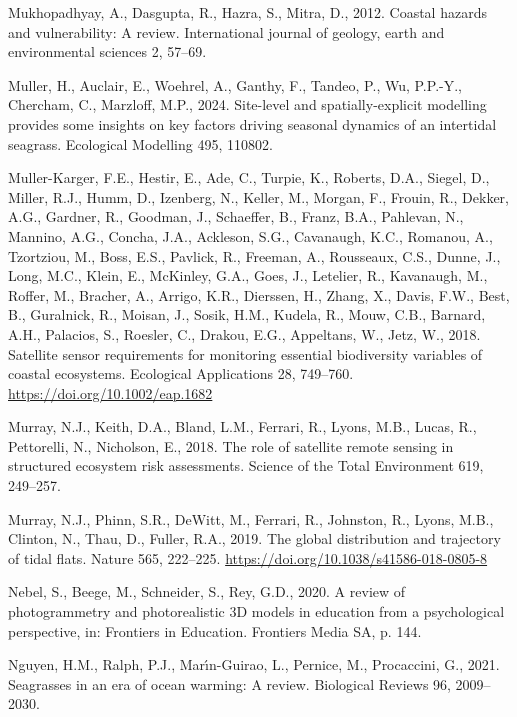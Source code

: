 \documentclass[
  letterpaper,
  11pt,
  english,
  singlespacing,
  headsepline]{MastersDoctoralThesis}
\newlength{\cslhangindent}
\newenvironment{CSLReferences}[2] %
 {\begin{list}{}{%
  \setlength{\itemindent}{0pt}
  \setlength{\leftmargin}{0pt}
  \setlength{\parsep}{0pt}
  \ifodd #1
   \setlength{\leftmargin}{\cslhangindent}
   \setlength{\itemindent}{-1\cslhangindent}
  \fi
  \setlength{\itemsep}{#2\baselineskip}}}
 {\end{list}}
\begin{document}
\begin{CSLReferences}{1}{0}
Mukhopadhyay, A., Dasgupta, R., Hazra, S., Mitra, D., 2012. Coastal
hazards and vulnerability: A review. International journal of geology,
earth and environmental sciences 2, 57--69.

Muller, H., Auclair, E., Woehrel, A., Ganthy, F., Tandeo, P., Wu,
P.P.-Y., Chercham, C., Marzloff, M.P., 2024. Site-level and
spatially-explicit modelling provides some insights on key factors
driving seasonal dynamics of an intertidal seagrass. Ecological
Modelling 495, 110802.

Muller-Karger, F.E., Hestir, E., Ade, C., Turpie, K., Roberts, D.A.,
Siegel, D., Miller, R.J., Humm, D., Izenberg, N., Keller, M., Morgan,
F., Frouin, R., Dekker, A.G., Gardner, R., Goodman, J., Schaeffer, B.,
Franz, B.A., Pahlevan, N., Mannino, A.G., Concha, J.A., Ackleson, S.G.,
Cavanaugh, K.C., Romanou, A., Tzortziou, M., Boss, E.S., Pavlick, R.,
Freeman, A., Rousseaux, C.S., Dunne, J., Long, M.C., Klein, E.,
McKinley, G.A., Goes, J., Letelier, R., Kavanaugh, M., Roffer, M.,
Bracher, A., Arrigo, K.R., Dierssen, H., Zhang, X., Davis, F.W., Best,
B., Guralnick, R., Moisan, J., Sosik, H.M., Kudela, R., Mouw, C.B.,
Barnard, A.H., Palacios, S., Roesler, C., Drakou, E.G., Appeltans, W.,
Jetz, W., 2018. {Satellite sensor requirements for monitoring essential
biodiversity variables of coastal ecosystems}. Ecological Applications
28, 749--760. \url{https://doi.org/10.1002/eap.1682}

Murray, N.J., Keith, D.A., Bland, L.M., Ferrari, R., Lyons, M.B., Lucas,
R., Pettorelli, N., Nicholson, E., 2018. The role of satellite remote
sensing in structured ecosystem risk assessments. Science of the Total
Environment 619, 249--257.

Murray, N.J., Phinn, S.R., DeWitt, M., Ferrari, R., Johnston, R., Lyons,
M.B., Clinton, N., Thau, D., Fuller, R.A., 2019. {The global
distribution and trajectory of tidal flats}. Nature 565, 222--225.
\url{https://doi.org/10.1038/s41586-018-0805-8}

Nebel, S., Beege, M., Schneider, S., Rey, G.D., 2020. A review of
photogrammetry and photorealistic 3D models in education from a
psychological perspective, in: Frontiers in Education. Frontiers Media
SA, p. 144.

Nguyen, H.M., Ralph, P.J., Marı́n-Guirao, L., Pernice, M., Procaccini,
G., 2021. Seagrasses in an era of ocean warming: A review. Biological
Reviews 96, 2009--2030.


\end{CSLReferences}
\end{document}
